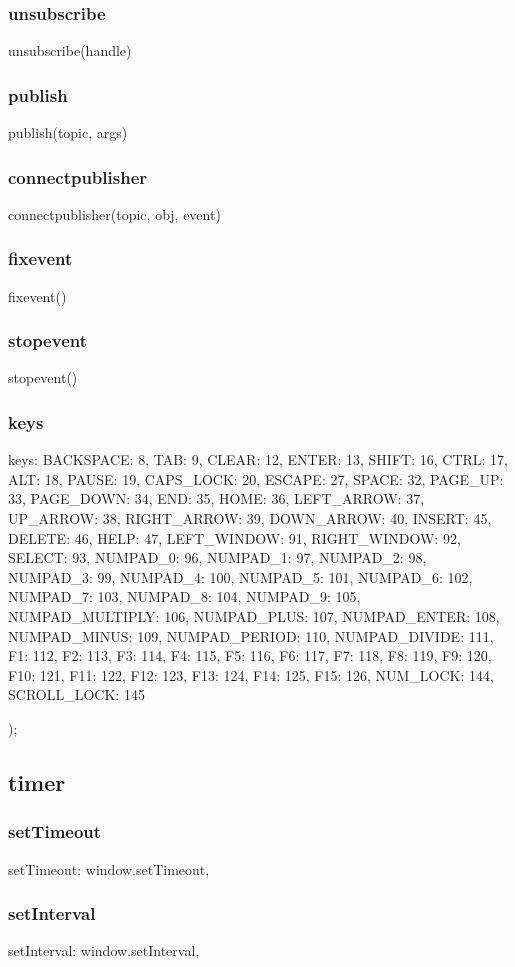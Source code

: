 {\subsubsection*{unsubscribe}
unsubscribe(handle)
\subsubsection*{publish}
publish(topic, args)
\subsubsection*{connectpublisher}
connectpublisher(topic, obj, event)
\subsubsection*{fixevent}
fixevent()
\subsubsection*{stopevent}
stopevent()
\subsubsection*{keys}
keys: { BACKSPACE: 8, TAB: 9, CLEAR: 12, ENTER: 13, SHIFT: 16, CTRL: 17, ALT:
18, PAUSE: 19, CAPS_LOCK: 20, 
		    ESCAPE: 27, SPACE: 32, PAGE_UP: 33, PAGE_DOWN: 34, END: 35,
HOME: 36, LEFT_ARROW: 37, UP_ARROW: 38,
		    RIGHT_ARROW: 39, DOWN_ARROW: 40, INSERT: 45, DELETE: 46,
HELP: 47, LEFT_WINDOW: 91, RIGHT_WINDOW: 92,
		    SELECT: 93, NUMPAD_0: 96, NUMPAD_1: 97, NUMPAD_2: 98,
NUMPAD_3: 99, NUMPAD_4: 100, NUMPAD_5: 101,
		    NUMPAD_6: 102, NUMPAD_7: 103, NUMPAD_8: 104, NUMPAD_9: 105,
NUMPAD_MULTIPLY: 106, NUMPAD_PLUS: 107,
		    NUMPAD_ENTER: 108, NUMPAD_MINUS: 109, NUMPAD_PERIOD: 110,
NUMPAD_DIVIDE: 111, F1: 112, F2: 113, F3: 114,
		    F4: 115, F5: 116, F6: 117, F7: 118, F8: 119, F9: 120, F10:
121, F11: 122, F12: 123, F13: 124, 
		    F14: 125, F15: 126, NUM_LOCK: 144, SCROLL_LOCK: 145 }
    });

\subsection{timer}
\subsubsection*{setTimeout}
setTimeout: window.setTimeout,
\subsubsection*{setInterval}
setInterval: window.setInterval,

